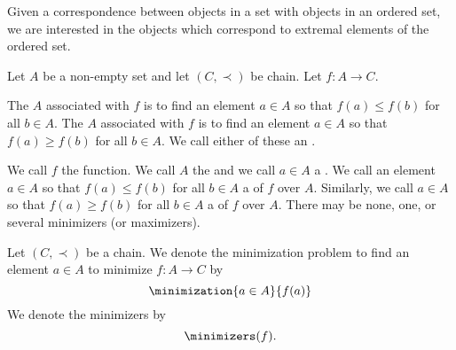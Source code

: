 

Given a correspondence between
objects in a set with objects
in an ordered set, we are interested
in the objects which correspond to
extremal elements of the ordered set.


Let $A$ be a non-empty set
and let $(C, \prec)$ be chain.
Let $f: A \to C$.

The 
 $A$ associated with
$f$ is to find an element
$a \in A$ so that
$f(a) \leq f(b)$ for all $b \in A$.
The 
 $A$ associated with
$f$ is to find an element
$a \in A$ so that
$f(a) \geq f(b)$ for all $b \in A$.
We call either of these
an .

We call $f$ the 
function.
We call $A$ the
 and we call $a \in A$ a
.
We call an element
$a \in A$ so that $f(a) \leq f(b)$
for all $b \in A$ a 
of $f$ over $A$. Similarly, we call
$a \in A$ so that $f(a) \geq f(b)$
for all $b \in A$ a 
of $f$ over $A$.
There may be none, one, or several
minimizers (or maximizers).


Let $(C, \prec)$ be
a chain.
We denote the minimization
problem to find
an element $a \in A$
to minimize $f: A \to C$ by
\[
  \minimization{a \in A}{f(a)}
\]
We denote the minimizers by
\[
  \minimizers(f).
\]
